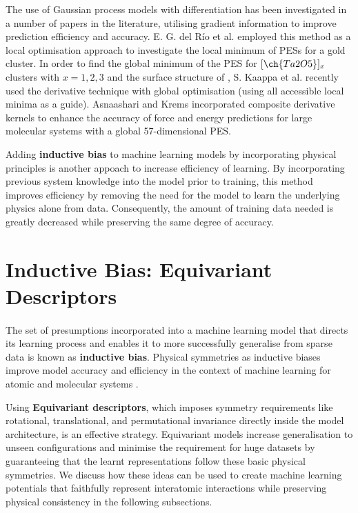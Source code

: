 The use of Gaussian process models with differentiation has been investigated in a number of papers in the literature, utilising gradient information to improve prediction efficiency and accuracy.
E. G. del Río et al. \cite{GarijodelRo2019} employed this method as a local optimisation approach to investigate the local minimum of PESs for a gold cluster.
In order to find the global minimum of the PES for $[\ch{Ta2O5}]_{x}$ clusters with $x=1,2,3$ and the surface structure of , S. Kaappa et al.\cite{Kaappa2021} recently used the derivative technique with global optimisation (using all accessible local minima as a guide). 
Asnaashari and Krems \cite{Asnaashari2021} incorporated composite derivative kernels to enhance the accuracy of force and energy predictions for large molecular systems with a global 57-dimensional PES.

Adding \textbf{inductive bias} to machine learning models by incorporating physical principles is another appoach to increase efficiency of learning.
By incorporating previous system knowledge into the model prior to training, this method improves efficiency by removing the need for the model to learn the underlying physics alone from data.
Consequently, the amount of training data needed is greatly decreased while preserving the same degree of accuracy.

\section{Inductive Bias: Equivariant Descriptors} \label{sec:2.4}\paragraph{}
The set of presumptions incorporated into a machine learning model that directs its learning process and enables it to more successfully generalise from sparse data is known as \textbf{inductive bias}.
Physical symmetries as inductive biases improve model accuracy and efficiency in the context of machine learning for atomic and molecular systems \cite{Langer2022,Meyer2023,Langer2024}.

Using \textbf{Equivariant descriptors}, which imposes symmetry requirements like rotational, translational, and permutational invariance directly inside the model architecture, is an effective strategy.
Equivariant models increase generalisation to unseen configurations and minimise the requirement for huge datasets by guaranteeing that the learnt representations follow these basic physical symmetries.
We discuss how these ideas can be used to create machine learning potentials that faithfully represent interatomic interactions while preserving physical consistency in the following subsections.

